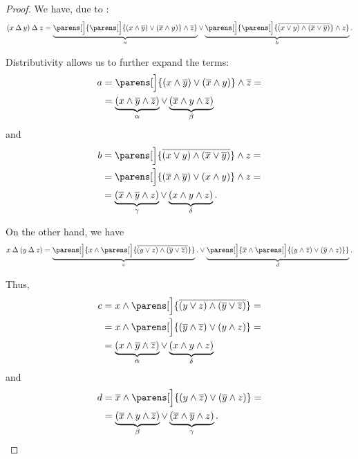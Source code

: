 \begin{proof}
   We have, due to :
  \begin{equation*}
    (x \symdiff y) \symdiff z
    =
    \underbrace{ \parens[\Big]{\parens[\Big]{ (x \wedge \oline y) \vee (\oline x \wedge y) } \wedge \oline z } }_a
    \vee
    \underbrace{ \parens[\Big]{\parens[\Big]{ \oline{(x \vee y) \wedge (\oline x \vee \oline y)} } \wedge z } }_b.
  \end{equation*}

  Distributivity allows us to further expand the terms:
  \begin{align*}
    a
    &=
    \parens[\Big]{ (x \wedge \oline y) \vee (\oline x \wedge y) } \wedge \oline z
    = \\ &=
    \underbrace{(x \wedge \oline y \wedge \oline z)}_\alpha \vee \underbrace{(\oline x \wedge y \wedge \oline z)}_\beta
  \end{align*}
  and
  \begin{align*}
    b
    &=
    \parens[\Big]{ \oline{(x \vee y) \wedge (\oline x \vee \oline y)} } \wedge z
    = \\ &=
    \parens[\Big]{ (\oline x \wedge \oline y) \vee (x \wedge y) } \wedge z
    = \\ &=
    \underbrace{(\oline x \wedge \oline y \wedge z)}_\gamma \vee \underbrace{(x \wedge y \wedge z)}_\delta.
  \end{align*}

  On the other hand, we have
  \begin{equation*}
    x \symdiff (y \symdiff z)
    =
    \underbrace{ \parens[\Big]{ x \wedge \parens[\Big]{ \oline{(y \vee z) \wedge (\oline y \vee \oline z)} } } }_c.
    \vee
    \underbrace{ \parens[\Big]{ \oline x \wedge \parens[\Big]{ (y \wedge \oline z) \vee (\oline y \wedge z) } } }_d.
  \end{equation*}

  Thus,
  \begin{align*}
    c
    &=
    x \wedge \parens[\Big]{ \oline{(y \vee z) \wedge (\oline y \vee \oline z)} }
    = \\ &=
    x \wedge \parens[\Big]{ (\oline y \wedge \oline z) \vee (y \wedge z)}
    = \\ &=
    \underbrace{(x \wedge \oline y \wedge \oline z)}_\alpha \vee \underbrace{(x \wedge y \wedge z)}_\delta
  \end{align*}
  and
  \begin{align*}
    d
    &=
    \oline x \wedge \parens[\Big]{ (y \wedge \oline z) \vee (\oline y \wedge z) }
    = \\ &=
    \underbrace{(\oline x \wedge y \wedge \oline z)}_\beta \vee \underbrace{(\oline x \wedge \oline y \wedge z)}_\gamma.
  \end{align*}


\end{proof}
